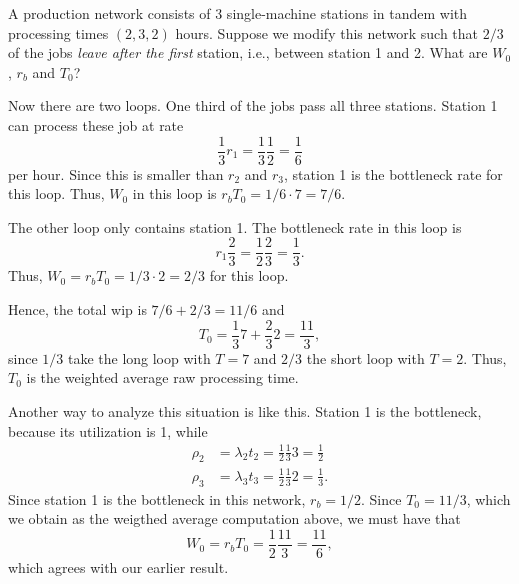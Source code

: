 \begin{question}
  A production network consists of 3 single-machine stations in tandem
  with processing times $(2, 3, 2)$ hours.  Suppose we modify this
  network such that $2/3$ of the jobs \emph{ leave after the first}
  station, i.e., between station 1 and 2.  What are $W_0$, $r_b$ and
  $T_0$? 
\begin{solution}
  Now there are two loops. One third of the jobs pass all three
  stations. Station 1 can process these job at rate 
  \begin{equation*}
\frac13 r_1 = \frac 13 \frac 12=\frac 16
  \end{equation*}
  per hour. Since this is smaller than $r_2$ and $r_3$, station 1 is
  the bottleneck rate for this loop. Thus, $W_0$ in this loop is
  $r_b T_0 = 1/6\cdot 7 = 7/6$.

  The other loop only contains station 1. The bottleneck rate in this
  loop is 
  \begin{equation*}
r_1\frac23 = \frac12\frac23 = \frac13. 
  \end{equation*}
Thus,
  $W_0 = r_b T_0 = 1/3\cdot 2 = 2/3$ for this loop. 

Hence, the total wip is $7/6 + 2/3 = 11/6$ and
\begin{equation*}
T_0 = \frac13  7 + \frac 23  2=\frac{11}3,
\end{equation*}
since $1/3$ take the long loop with $T=7$ and $2/3$ the short loop
with $T=2$. Thus, $T_0$ is the weighted average raw processing time.

Another way to analyze this situation is like this. Station 1 is the
bottleneck, because its utilization is 1, while
\begin{align*}
  \rho_2 &= \lambda_2 t_2 = \frac12\frac13 3 = \frac 12\\
  \rho_3 &= \lambda_3 t_3 = \frac12\frac13 2 = \frac 13.
\end{align*}
Since station 1 is the bottleneck in this network, $r_b=1/2$. Since
$T_0 = 11/3$, which we obtain as the weigthed average computation
above, we must have that 
\begin{equation*}
W_0 = r_b T_0 = \frac12\frac{11}3 = \frac{11}6, 
\end{equation*}
which agrees with our earlier result.
\end{solution}
\end{question}



